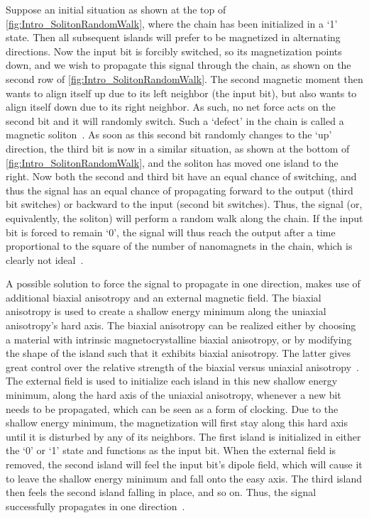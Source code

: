 \documentclass[11pt,a4paper,english,twoside]{article}
\begin{document}
Suppose an initial situation as shown at the top of \cref{fig:Intro_SolitonRandomWalk}, where the chain has been initialized in a `1' state. Then all subsequent islands will prefer to be magnetized in alternating directions. Now the input bit is forcibly switched, so its magnetization points down, and we wish to propagate this signal through the chain, as shown on the second row of \cref{fig:Intro_SolitonRandomWalk}. The second magnetic moment then wants to align itself up due to its left neighbor (the input bit), but also wants to align itself down due to its right neighbor. As such, no net force acts on the second bit and it will randomly switch. Such a `defect' in the chain is called a magnetic soliton~\cite{MQCA_RoomTemp}. As soon as this second bit randomly changes to the `up' direction, the third bit is now in a similar situation, as shown at the bottom of \cref{fig:Intro_SolitonRandomWalk}, and the soliton has moved one island to the right. Now both the second and third bit have an equal chance of switching, and thus the signal has an equal chance of propagating forward to the output (third bit switches) or backward to the input (second bit switches). Thus, the signal (or, equivalently, the soliton) will perform a random walk along the chain. If the input bit is forced to remain `0', the signal will thus reach the output after a time proportional to the square of the number of nanomagnets in the chain, which is clearly not ideal~\cite{Wolfram_RandomWalk}. \par
A possible solution to force the signal to propagate in one direction, makes use of additional biaxial anisotropy and an external magnetic field. The biaxial anisotropy is used to create a shallow energy minimum along the uniaxial anisotropy's hard axis. The biaxial anisotropy can be realized either by choosing a material with intrinsic magnetocrystalline biaxial anisotropy, or by modifying the shape of the island such that it exhibits biaxial anisotropy. The latter gives great control over the relative strength of the biaxial versus uniaxial anisotropy~\cite{SubnanosecondPropagation_AnisotropyChains,Anisotropy_Concave}. The external field is used to initialize each island in this new shallow energy minimum, along the hard axis of the uniaxial anisotropy, whenever a new bit needs to be propagated, which can be seen as a form of clocking. Due to the shallow energy minimum, the magnetization will first stay along this hard axis until it is disturbed by any of its neighbors. The first island is initialized in either the `0' or `1' state and functions as the input bit. When the external field is removed, the second island will feel the input bit's dipole field, which will cause it to leave the shallow energy minimum and fall onto the easy axis. The third island then feels the second island falling in place, and so on. Thus, the signal successfully propagates in one direction~\cite{NML_Carlton,Anisotropy_Concave}. \par
\end{document}
